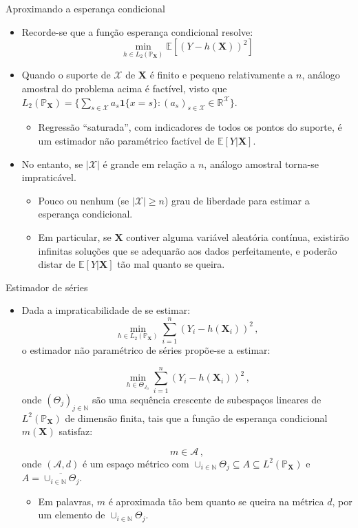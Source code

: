 \documentclass[11pt]{beamer}
\begin{document}
	\begin{frame}{Aproximando a esperança condicional}
		\begin{itemize}
			\item Recorde-se que a função esperança condicional resolve:
			$$\min_{h \in L_2(\mathbb{P}_{\boldsymbol{X}})} \mathbb{E}[(Y-h(\boldsymbol{X}))^2]$$
			\item Quando o suporte de $\mathcal{X}$ de $\boldsymbol{X}$ é finito e pequeno relativamente a $n$, análogo amostral do problema acima é factível, visto que $L_2(\mathbb{P}_{\boldsymbol{X}}) = \{\sum_{s \in \mathcal{X}} a_s \mathbf{1}\{x = s\}: (a_s)_{s\in \mathcal{X}} \in \mathbb{R}^{\mathcal{X}}\}$.
			\begin{itemize}
				\item Regressão ``saturada'', com indicadores de todos os pontos do suporte, é um estimador não paramétrico factível de $\mathbb{E}[Y|\boldsymbol{X}]$.
			\end{itemize}
			\item No entanto, se $|\mathcal{X}|$ é grande em relação a $n$, análogo amostral torna-se impraticável.
			\begin{itemize}
				\item Pouco ou nenhum (se $|\mathcal{X}|\geq n$) grau de liberdade para estimar a esperança condicional.
				\item Em particular, se $\boldsymbol{X}$ contiver alguma variável aleatória contínua, existirão infinitas soluções que se adequarão aos dados perfeitamente, e poderão distar de $\mathbb{E}[Y|\boldsymbol{X}]$ tão mal quanto se queira.
			\end{itemize}
		\end{itemize}
	\end{frame}
	
	\begin{frame}{Estimador de séries}
		\begin{itemize}
			\item Dada a impraticabilidade de se estimar:
				$$\min_{h \in L_2(\mathbb{P}_{\boldsymbol{X}})} \sum_{i=1}^n (Y_i-h(\boldsymbol{X}_i))^2 \, ,$$
				o estimador não paramétrico de {\color{red}séries} propõe-se a estimar:
				
				$$\min_{h \in \Theta_{J_n}} \sum_{i=1}^n (Y_i-h(\boldsymbol{X}_i))^2 \, ,$$
				onde $(\Theta_{j})_{j \in \mathbb{N}}$ são uma sequência crescente de subespaços lineares de $L^2(\mathbb{P}_{\boldsymbol{X}})$ de {\color{blue}dimensão finita}, tais que a função de esperança condicional $m(\boldsymbol{X})$ satisfaz:
				
				$$m \in  \mathcal{A}\,,$$
				onde $(\mathcal{A},d)$ é um espaço métrico com $\cup_{i \in \mathbb{N}} \Theta_j \subseteq A \subseteq L^2(\mathbb{P}_{\boldsymbol{X}})$ e $A = \overline{\cup_{i \in \mathbb{N}} \Theta_j}$.
				\begin{itemize}
					\item Em palavras, $m$ é aproximada tão bem quanto se queira na métrica $d$, por um elemento de $\cup_{i \in \mathbb{N}} \Theta_j$.
				\end{itemize}
		\end{itemize}
	\end{frame}
	
\end{document}
